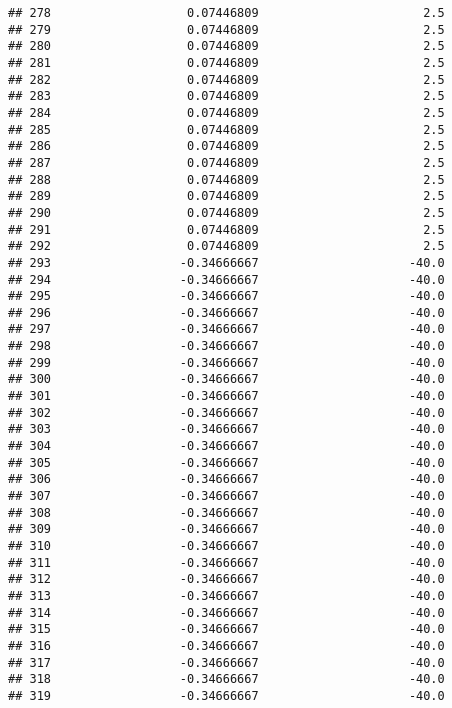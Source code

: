 \documentclass[]{article}
\begin{document}
\begin{verbatim}
## 278                   0.07446809                       2.5
## 279                   0.07446809                       2.5
## 280                   0.07446809                       2.5
## 281                   0.07446809                       2.5
## 282                   0.07446809                       2.5
## 283                   0.07446809                       2.5
## 284                   0.07446809                       2.5
## 285                   0.07446809                       2.5
## 286                   0.07446809                       2.5
## 287                   0.07446809                       2.5
## 288                   0.07446809                       2.5
## 289                   0.07446809                       2.5
## 290                   0.07446809                       2.5
## 291                   0.07446809                       2.5
## 292                   0.07446809                       2.5
## 293                  -0.34666667                     -40.0
## 294                  -0.34666667                     -40.0
## 295                  -0.34666667                     -40.0
## 296                  -0.34666667                     -40.0
## 297                  -0.34666667                     -40.0
## 298                  -0.34666667                     -40.0
## 299                  -0.34666667                     -40.0
## 300                  -0.34666667                     -40.0
## 301                  -0.34666667                     -40.0
## 302                  -0.34666667                     -40.0
## 303                  -0.34666667                     -40.0
## 304                  -0.34666667                     -40.0
## 305                  -0.34666667                     -40.0
## 306                  -0.34666667                     -40.0
## 307                  -0.34666667                     -40.0
## 308                  -0.34666667                     -40.0
## 309                  -0.34666667                     -40.0
## 310                  -0.34666667                     -40.0
## 311                  -0.34666667                     -40.0
## 312                  -0.34666667                     -40.0
## 313                  -0.34666667                     -40.0
## 314                  -0.34666667                     -40.0
## 315                  -0.34666667                     -40.0
## 316                  -0.34666667                     -40.0
## 317                  -0.34666667                     -40.0
## 318                  -0.34666667                     -40.0
## 319                  -0.34666667                     -40.0

\end{verbatim}
\end{document}
